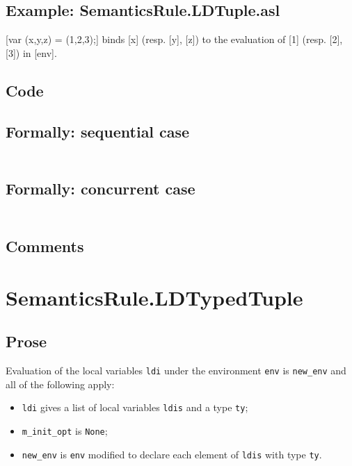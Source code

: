 \documentclass{book}
\begin{document}
    \subsection{Example: SemanticsRule.LDTuple.asl}
    [var (x,y,z) = (1,2,3);] binds [x] (resp. [y], [z]) to the evaluation of
    [1] (resp. [2], [3]) in [env].

  \subsection{Code}

  \subsection{Formally: sequential case}
  \begin{align}
  \end{align} 

  \subsection{Formally: concurrent case}
  \begin{align}
  \end{align} 

    \subsection{Comments}

\section{SemanticsRule.LDTypedTuple \label{sec:SemanticsRule.LDTypedTuple}}

    \subsection{Prose}
Evaluation of the local variables \texttt{ldi} under the environment
\texttt{env} is \texttt{new\_env} and all of the following apply:
    \begin{itemize}
    \item \texttt{ldi} gives a list of local variables \texttt{ldis} and a type \texttt{ty};
    \item \texttt{m\_init\_opt} is \texttt{None};
    \item \texttt{new\_env} is \texttt{env} modified to declare each element of \texttt{ldis} with type \texttt{ty}.
    \end{itemize}
\end{document}
